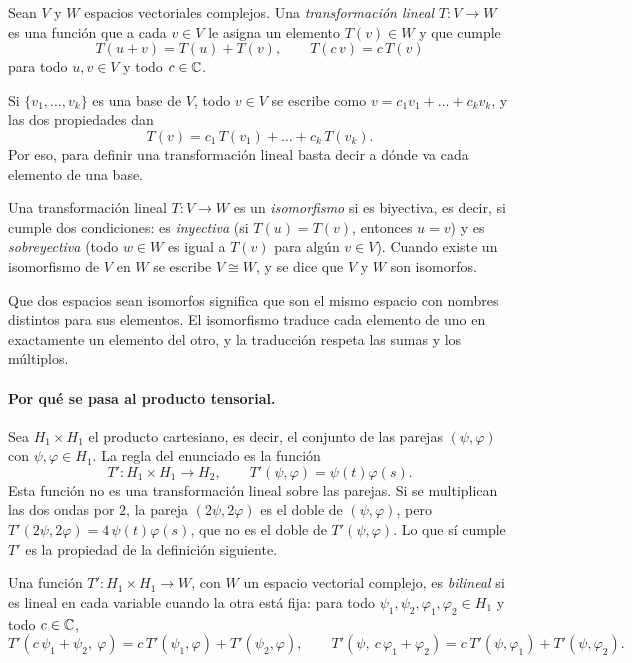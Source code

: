 \begin{definicionT}
Sean $V$ y $W$ espacios vectoriales complejos. Una \emph{transformación lineal} $T\colon V\to W$ es una función que a cada $v\in V$ le asigna un elemento $T(v)\in W$ y que cumple
\[
  T(u+v)=T(u)+T(v),\qquad T(c\,v)=c\,T(v)
\]
para todo $u,v\in V$ y todo $c\in\mathbb{C}$.
\end{definicionT}

Si $\{v_1,\dots,v_k\}$ es una base de $V$, todo $v\in V$ se escribe como $v=c_1v_1+\dots+c_kv_k$, y las dos propiedades dan
\[
  T(v)=c_1\,T(v_1)+\dots+c_k\,T(v_k).
\]
Por eso, para definir una transformación lineal basta decir a dónde va cada elemento de una base.

\begin{definicionT}[Isomorfismo]
Una transformación lineal $T\colon V\to W$ es un \emph{isomorfismo} si es biyectiva, es decir, si cumple dos condiciones: es \emph{inyectiva} (si $T(u)=T(v)$, entonces $u=v$) y es \emph{sobreyectiva} (todo $w\in W$ es igual a $T(v)$ para algún $v\in V$). Cuando existe un isomorfismo de $V$ en $W$ se escribe $V\cong W$, y se dice que $V$ y $W$ son isomorfos.
\end{definicionT}

Que dos espacios sean isomorfos significa que son el mismo espacio con nombres distintos para sus elementos. El isomorfismo traduce cada elemento de uno en exactamente un elemento del otro, y la traducción respeta las sumas y los múltiplos.

\paragraph{Por qué se pasa al producto tensorial.} Sea $H_1\times H_1$ el producto cartesiano, es decir, el conjunto de las parejas $(\psi,\varphi)$ con $\psi,\varphi\in H_1$. La regla del enunciado es la función
\[
  T'\colon H_1\times H_1\to H_2,\qquad T'(\psi,\varphi)=\psi(t)\varphi(s).
\]
Esta función no es una transformación lineal sobre las parejas. Si se multiplican las dos ondas por $2$, la pareja $(2\psi,2\varphi)$ es el doble de $(\psi,\varphi)$, pero $T'(2\psi,2\varphi)=4\,\psi(t)\varphi(s)$, que no es el doble de $T'(\psi,\varphi)$. Lo que sí cumple $T'$ es la propiedad de la definición siguiente.

\begin{definicionT}
Una función $T'\colon H_1\times H_1\to W$, con $W$ un espacio vectorial complejo, es \emph{bilineal} si es lineal en cada variable cuando la otra está fija: para todo $\psi_1,\psi_2,\varphi_1,\varphi_2\in H_1$ y todo $c\in\mathbb{C}$,
\[
  T'(c\,\psi_1+\psi_2,\ \varphi)=c\,T'(\psi_1,\varphi)+T'(\psi_2,\varphi),\qquad
  T'(\psi,\ c\,\varphi_1+\varphi_2)=c\,T'(\psi,\varphi_1)+T'(\psi,\varphi_2).
\]
\end{definicionT}

